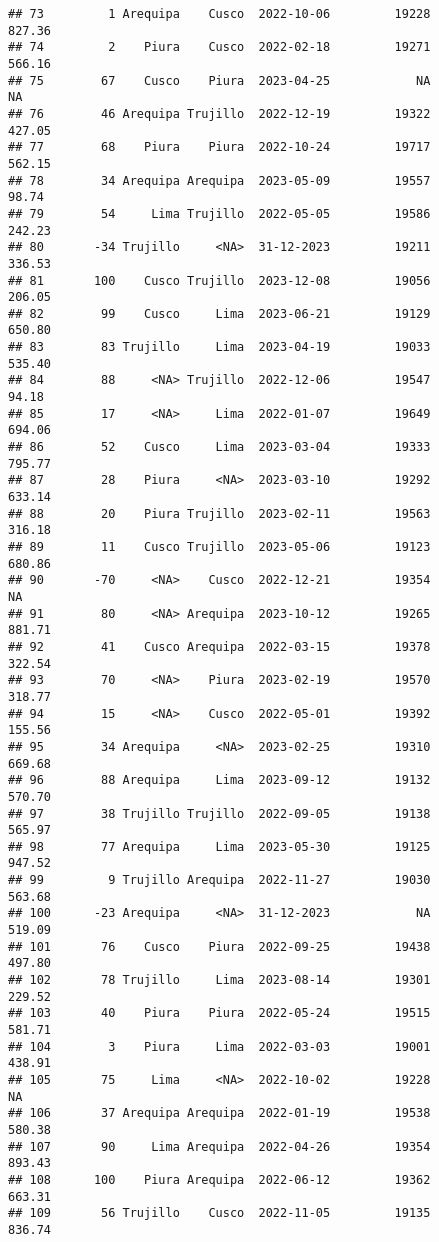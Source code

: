 \documentclass[
]{article}
\begin{document}
\begin{verbatim}
## 73         1 Arequipa    Cusco  2022-10-06         19228      827.36
## 74         2    Piura    Cusco  2022-02-18         19271      566.16
## 75        67    Cusco    Piura  2023-04-25            NA          NA
## 76        46 Arequipa Trujillo  2022-12-19         19322      427.05
## 77        68    Piura    Piura  2022-10-24         19717      562.15
## 78        34 Arequipa Arequipa  2023-05-09         19557       98.74
## 79        54     Lima Trujillo  2022-05-05         19586      242.23
## 80       -34 Trujillo     <NA>  31-12-2023         19211      336.53
## 81       100    Cusco Trujillo  2023-12-08         19056      206.05
## 82        99    Cusco     Lima  2023-06-21         19129      650.80
## 83        83 Trujillo     Lima  2023-04-19         19033      535.40
## 84        88     <NA> Trujillo  2022-12-06         19547       94.18
## 85        17     <NA>     Lima  2022-01-07         19649      694.06
## 86        52    Cusco     Lima  2023-03-04         19333      795.77
## 87        28    Piura     <NA>  2023-03-10         19292      633.14
## 88        20    Piura Trujillo  2023-02-11         19563      316.18
## 89        11    Cusco Trujillo  2023-05-06         19123      680.86
## 90       -70     <NA>    Cusco  2022-12-21         19354          NA
## 91        80     <NA> Arequipa  2023-10-12         19265      881.71
## 92        41    Cusco Arequipa  2022-03-15         19378      322.54
## 93        70     <NA>    Piura  2023-02-19         19570      318.77
## 94        15     <NA>    Cusco  2022-05-01         19392      155.56
## 95        34 Arequipa     <NA>  2023-02-25         19310      669.68
## 96        88 Arequipa     Lima  2023-09-12         19132      570.70
## 97        38 Trujillo Trujillo  2022-09-05         19138      565.97
## 98        77 Arequipa     Lima  2023-05-30         19125      947.52
## 99         9 Trujillo Arequipa  2022-11-27         19030      563.68
## 100      -23 Arequipa     <NA>  31-12-2023            NA      519.09
## 101       76    Cusco    Piura  2022-09-25         19438      497.80
## 102       78 Trujillo     Lima  2023-08-14         19301      229.52
## 103       40    Piura    Piura  2022-05-24         19515      581.71
## 104        3    Piura     Lima  2022-03-03         19001      438.91
## 105       75     Lima     <NA>  2022-10-02         19228          NA
## 106       37 Arequipa Arequipa  2022-01-19         19538      580.38
## 107       90     Lima Arequipa  2022-04-26         19354      893.43
## 108      100    Piura Arequipa  2022-06-12         19362      663.31
## 109       56 Trujillo    Cusco  2022-11-05         19135      836.74

\end{verbatim}
\end{document}
